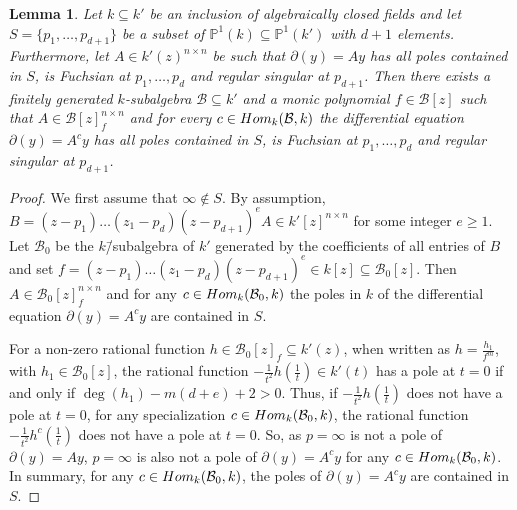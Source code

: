 \documentclass[10pt,a4paper]{amsart}
\newtheorem{lemma}[theorem]{Lemma}
\def\P{\mathbb P}
\def\l{\mathcal}
\def\del{\partial}
\def\Hom{\textup{Hom}}
\begin{document}
\begin{lemma}\label{lem:regsing}	
	Let $k\subseteq k'$ be an inclusion of algebraically closed fields and let $S=\{p_1,\ldots,p_{d+1}\}$ be a subset of $\P^1(k)\subseteq\P^1(k')$ with $d+1$ elements. Furthermore, let $A \in k'(z)^{n \times n}$ be such that $\del(y)=Ay$ has all poles contained in $S$, is Fuchsian at $p_1,\ldots,p_d$ and regular singular at $p_{d+1}$. Then there exists a finitely generated $k$-subalgebra $\l B \subseteq k'$ and a monic polynomial $f \in \l B[z]$ such that $A \in \l B[z]_f^{n \times n}$ and for every $c \in \Hom_k(\l B, k)$ the differential equation $\del (y) =A^c y$ has all poles contained in $S$, is Fuchsian at $p_1,\ldots,p_d$ and regular singular at $p_{d+1}$.	
\end{lemma}

\begin{proof}
	We first assume that $\infty\notin S$. By assumption,
	$B=(z-p_1)\ldots(z_1-p_d)(z-p_{d+1})^eA\in k'[z]^{n\times n}$ for some integer $e\geq 1$.	
		 Let $\l B_0$ be the $k$\=/subalgebra of $k'$ generated by the coefficients of all entries of $B$ and set $f=(z-p_1)\ldots(z_1-p_d)(z-p_{d+1})^e\in k[z]\subseteq\l B_0[z]$.
	Then $A\in \l B_0[z]_{f}^{n\times n}$ and for any $c \in \Hom_k(\l B_0, k)$ the poles in $k$ of the differential equation $\del (y) =A^c y$ are contained in $S$.
	
	For a non-zero rational function $h\in \l B_0[z]_{f}\subseteq k'(z)$, when written as $h=\frac{h_1}{f^m}$, with $h_1\in\l B_0[z]$, the rational function $-\frac{1}{t^2}h(\frac{1}{t})\in k'(t)$ has a pole at $t=0$ if and only if $\deg(h_1)-m(d+e)+2>0$. Thus, if $-\frac{1}{t^2}h(\frac{1}{t})$ does not have a pole at $t=0$, for any specialization $c\in \Hom_k(\l B_0, k)$, the rational function $-\frac{1}{t^2}h^c(\frac{1}{t})$ does not have a pole at $t=0$. So, as $p=\infty$ is not a pole of $\del(y)=Ay$, 
	$p=\infty$ is also not a pole of $\del(y)=A^cy$ for any $c\in\Hom_k(\l B_0,k)$. In summary, for any $c\in\Hom_k(\l B_0,k)$, the poles of $\del(y)=A^cy$ are contained in $S$.
	

\end{proof}
\end{document}
